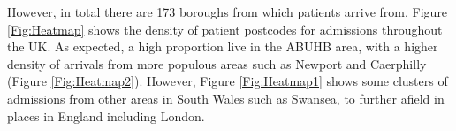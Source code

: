 \documentclass[../thesis.tex]{subfiles}
\begin{document}
\begin{table}[H]
    \centering{}
    \caption{ABUHB Admission Locations}
    \label{Tab:Locations}
\end{table}

However, in total there are 173 boroughs from which patients arrive from. Figure \ref{Fig:Heatmap} shows the density of patient postcodes for admissions throughout the UK. As expected, a high proportion live in the ABUHB area, with a higher density of arrivals from more populous areas such as Newport and Caerphilly (Figure \ref{Fig:Heatmap2}). However, Figure \ref{Fig:Heatmap1} shows some clusters of admissions from other areas in South Wales such as Swansea, to further afield in places in England including London.
\end{document}
